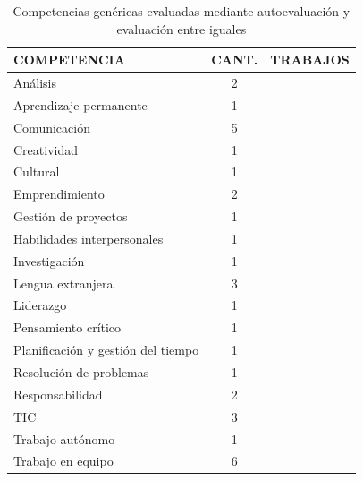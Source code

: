 \begin{table}
  \begin{center}
  \begin{tabular}{| m{6cm} | c | m{5cm} |}
    \hline
    COMPETENCIA & CANT. & TRABAJOS\\
    \hline
    \hline
    Análisis & 2 & \cite{carreras2013promotion,lasa2013problem} \\
    \hline
    Aprendizaje permanente & 1 & \cite{oliver2013graduate} \\
    \hline
    Comunicación & 5 &  \cite{masip2013self,ruizacarate2013soft,carreras2013promotion,martinez2014teamwork,oliver2013graduate} \\
    \hline
    Creatividad & 1 & \cite{piedra2010measuring} \\
    \hline
    Cultural & 1 & \cite{oliver2013graduate} \\
    \hline
    Emprendimiento & 2 & \cite{chang2009international,achcaoucaou2014competence} \\
    \hline
    Gestión de proyectos & 1 & \cite{martinez2014teamwork} \\
    \hline
    Habilidades interpersonales & 1 & \cite{martinez2014teamwork} \\
    \hline
    Investigación & 1 & \cite{oliver2013graduate} \\
    \hline 
    Lengua extranjera & 3 & \cite{renau2010teaching,masip2013self,sevilla2012assessment} \\
    \hline
    Liderazgo & 1 & \cite{martinez2014teamwork} \\
    \hline
    Pensamiento crítico & 1 & \cite{arno2011promoting} \\
    \hline
    Planificación y gestión del tiempo & 1 & \cite{martinez2014teamwork} \\
    \hline
    Resolución de problemas & 1 & \cite{oliver2013graduate} \\
    \hline
    Responsabilidad & 2 & \cite{ruizacarate2013soft,carreras2013promotion} \\
    \hline
    TIC & 3 & \cite{lasa2013problem,masip2013self,oliver2013graduate} \\
    \hline
    Trabajo autónomo & 1 &  \cite{lasa2013problem} \\
    \hline
    Trabajo en equipo & 6 &  \cite{lasa2013problem,ficapal2015learning,ruizacarate2013soft,piedra2010measuring,carreras2013promotion,martinez2014teamwork,oliver2013graduate} \\
    \hline
  \end{tabular}
\end{center}
\caption{Competencias genéricas evaluadas mediante autoevaluación y evaluación entre iguales}
\label{tab:CompetenciasAuto}
\end{table}

